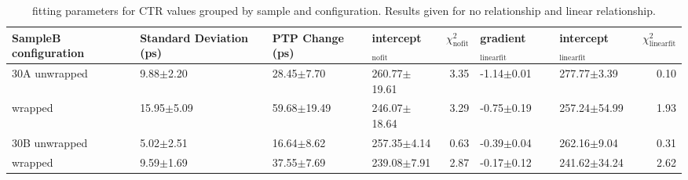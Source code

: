 \begin{table}
\caption{\label{tab:ctrfitresults} fitting parameters for CTR values grouped by sample and configuration. Results given for no relationship and linear relationship.}
\begin{tabular}{llllrllr}
\hline
SampleB configuration & Standard Deviation (ps) & PTP Change (ps) & intercept$_\text{nofit}$ &  $\chi^2_\text{nofit}$ & gradient$_\text{linearfit}$ & intercept$_\text{linearfit}$ &  $\chi^2_\text{linearfit}$ \\
\hline
30A     unwrapped     &   9.88$\pm$2.20 &   28.45$\pm$7.70 &  260.77$\pm$19.61 &                   3.35 &      -1.14$\pm$0.01 &    277.77$\pm$3.39 &                    0.10 \\
        wrapped       &  15.95$\pm$5.09 &  59.68$\pm$19.49 &  246.07$\pm$18.64 &                   3.29 &      -0.75$\pm$0.19 &   257.24$\pm$54.99 &                    1.93 \\
30B     unwrapped     &   5.02$\pm$2.51 &   16.64$\pm$8.62 &   257.35$\pm$4.14 &                   0.63 &      -0.39$\pm$0.04 &    262.16$\pm$9.04 &                    0.31 \\
        wrapped       &   9.59$\pm$1.69 &   37.55$\pm$7.69 &   239.08$\pm$7.91 &                   2.87 &      -0.17$\pm$0.12 &   241.62$\pm$34.24 &                    2.62 \\
\hline
\end{tabular}
\end{table}


